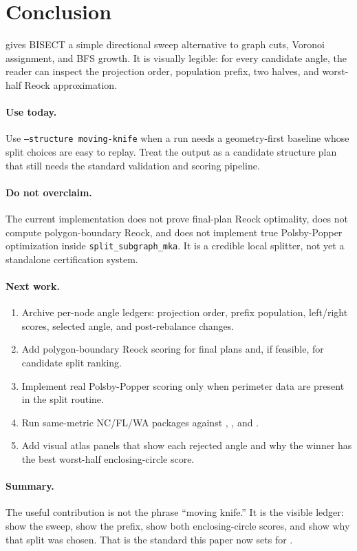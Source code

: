 \section{Conclusion}
\label{sec:conclusion}

\mka{} gives BISECT a simple directional sweep alternative to graph cuts,
Voronoi assignment, and BFS growth. It is visually legible: for every candidate
angle, the reader can inspect the projection order, population prefix, two
halves, and worst-half Reock approximation.

\paragraph{Use today.}
Use \texttt{--structure moving-knife} when a run needs a geometry-first
baseline whose split choices are easy to replay. Treat the output as a
candidate structure plan that still needs the standard validation and scoring
pipeline.

\paragraph{Do not overclaim.}
The current implementation does not prove final-plan Reock optimality, does not
compute polygon-boundary Reock, and does not implement true Polsby-Popper
optimization inside \texttt{split\_subgraph\_mka}. It is a credible local
splitter, not yet a standalone certification system.

\paragraph{Next work.}
\begin{enumerate}
\item Archive per-node angle ledgers: projection order, prefix population,
  left/right scores, selected angle, and post-rebalance changes.
\item Add polygon-boundary Reock scoring for final plans and, if feasible, for
  candidate split ranking.
\item Implement real Polsby-Popper scoring only when perimeter data are present
  in the split routine.
\item Run same-metric NC/FL/WA packages against \metis{}, \cvdgeo{}, and
  \bfsg{}.
\item Add visual atlas panels that show each rejected angle and why the winner
  has the best worst-half enclosing-circle score.
\end{enumerate}

\paragraph{Summary.}
The useful contribution is not the phrase ``moving knife.'' It is the visible
ledger: show the sweep, show the prefix, show both enclosing-circle scores, and
show why that split was chosen. That is the standard this paper now sets for
\mka{}.
